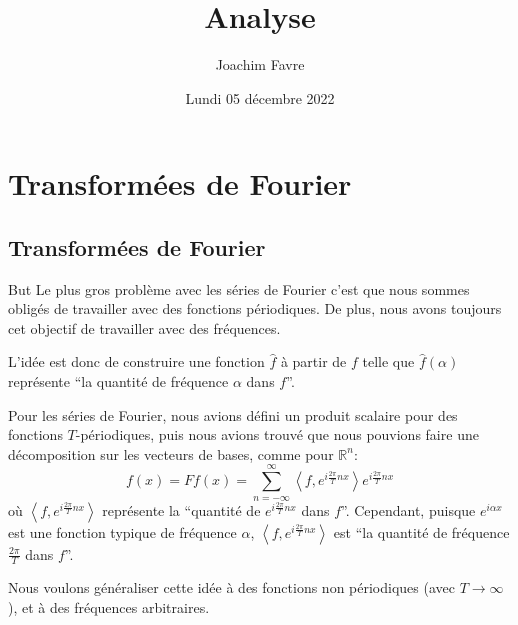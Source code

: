 \documentclass[a4paper]{article}
\title{Analyse}
\author{Joachim Favre}
\date{Lundi 05 décembre 2022}
\begin{document}
\maketitle


\section{Transformées de Fourier}
\subsection{Transformées de Fourier}

\begin{parag}{But}
    Le plus gros problème avec les séries de Fourier c'est que nous sommes obligés de travailler avec des fonctions périodiques. De plus, nous avons toujours cet objectif de travailler avec des fréquences.

    L'idée est donc de construire une fonction $\hat{f}$ à partir de $f$ telle que $\hat{f}\left(\alpha\right)$ représente ``la quantité de fréquence $\alpha$ dans $f$''.

    Pour les séries de Fourier, nous avions défini un produit scalaire pour des fonctions $T$-périodiques, puis nous avions trouvé que nous pouvions faire une décomposition sur les vecteurs de bases, comme pour $\mathbb{R}^n$: 
    \[f\left(x\right) = F f\left(x\right) = \sum_{n=-\infty}^{\infty} \left\langle f, e^{i\frac{2\pi}{T}nx} \right\rangle e^{i \frac{2\pi}{T}nx} \]
    où $\left\langle f, e^{i\frac{2\pi}{T}nx} \right\rangle$  représente la ``quantité de $e^{i\frac{2\pi}{T}nx}$ dans $f$''. Cependant, puisque $e^{i\alpha x}$ est une fonction typique de fréquence $\alpha$, $\left\langle f, e^{i \frac{2\pi}{T}nx} \right\rangle$ est ``la quantité de fréquence $\frac{2\pi}{T}$ dans $f$''.

    Nous voulons généraliser cette idée à des fonctions non périodiques (avec $T \to \infty$), et à des fréquences arbitraires.
\end{parag}
\end{document}
